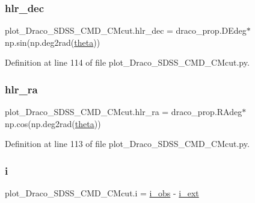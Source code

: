 \subsubsection{\texorpdfstring{hlr\+\_\+dec}{hlr\_dec}}
{\footnotesize\ttfamily plot\+\_\+\+Draco\+\_\+\+S\+D\+S\+S\+\_\+\+C\+M\+D\+\_\+\+C\+Mcut.\+hlr\+\_\+dec = draco\+\_\+prop.\+D\+Edeg$\ast$np.\+sin(np.\+deg2rad(\hyperlink{namespaceplot__Draco__SDSS__CMD__CMcut_a2e04bc162202f101d86aa8c604ec34c1}{theta}))}



Definition at line 114 of file plot\+\_\+\+Draco\+\_\+\+S\+D\+S\+S\+\_\+\+C\+M\+D\+\_\+\+C\+Mcut.\+py.

\mbox{\label{namespaceplot__Draco__SDSS__CMD__CMcut_a9b33fbee10f744052adb68e2f3bc584e}} 
\subsubsection{\texorpdfstring{hlr\+\_\+ra}{hlr\_ra}}
{\footnotesize\ttfamily plot\+\_\+\+Draco\+\_\+\+S\+D\+S\+S\+\_\+\+C\+M\+D\+\_\+\+C\+Mcut.\+hlr\+\_\+ra = draco\+\_\+prop.\+R\+Adeg$\ast$np.\+cos(np.\+deg2rad(\hyperlink{namespaceplot__Draco__SDSS__CMD__CMcut_a2e04bc162202f101d86aa8c604ec34c1}{theta}))}



Definition at line 113 of file plot\+\_\+\+Draco\+\_\+\+S\+D\+S\+S\+\_\+\+C\+M\+D\+\_\+\+C\+Mcut.\+py.

\mbox{\label{namespaceplot__Draco__SDSS__CMD__CMcut_a6d4ac228accda712923ca1b9740c0407}} 
\subsubsection{\texorpdfstring{i}{i}}
{\footnotesize\ttfamily plot\+\_\+\+Draco\+\_\+\+S\+D\+S\+S\+\_\+\+C\+M\+D\+\_\+\+C\+Mcut.\+i = \hyperlink{namespaceplot__Draco__SDSS__CMD__CMcut_a98d3e4d508df5a26d2951e5b5e18eb70}{i\+\_\+obs} -\/ \hyperlink{namespaceplot__Draco__SDSS__CMD__CMcut_a0eced3d157e86dd4cdcb96cc846ee0df}{i\+\_\+ext}}



